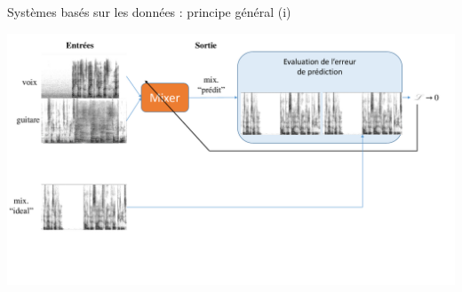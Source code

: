\documentclass[9pt, aspectratio=169]{beamer}
\begin{document}
\begin{frame}{Systèmes basés sur les données : principe général (i)} %

\includegraphics[width=.8\textwidth, page=1]{fig/schemas.pdf}

\end{frame}
\end{document}
